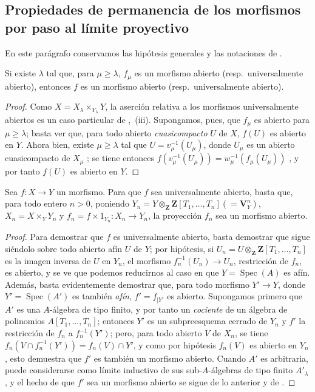 \subsection{Propiedades de permanencia de los morfismos por paso al límite proyectivo}
\label{subsection:IV.8.10}

En este parágrafo conservamos las hipótesis generales y las notaciones de .

\begin{proposition}[8.10.1]
\label{IV.8.10.1}
Si existe $\lambda$ tal que, para $\mu\geqslant\lambda$, $f_\mu$ es un morfismo abierto (resp.\ universalmente abierto), entonces $f$ es un morfismo abierto (resp.\ universalmente abierto).
\end{proposition}

\begin{proof}
Como $X=X_\lambda\times_{Y_\lambda}Y$, la aserción relativa a los morfismos universalmente abiertos es un caso particular de ,~(iii).
Supongamos, pues, que $f_\mu$ es abierto para $\mu\geqslant\lambda$; basta ver que, para todo abierto \emph{cuasicompacto} $U$ de $X$, $f(U)$ es abierto en $Y$.
Ahora bien, existe $\mu\geqslant\lambda$ tal que $U=v_\mu^{-1}(U_\mu)$, donde $U_\mu$ es un abierto cuasicompacto de $X_\mu$ ; se tiene entonces $f(v_\mu^{-1}(U_\mu))=w_\mu^{-1}(f_\mu(U_\mu))$ , y por tanto $f(U)$ es abierto en $Y$.
\end{proof}

\begin{corollary}[8.10.2]
\label{IV.8.10.2}
Sea $f:X\to Y$ un morfismo.
Para que $f$ sea universalmente abierto, basta que, para todo entero $n>0$, poniendo $Y_n=Y\otimes_\mathbf{Z}\mathbf{Z}[T_1,\ldots,T_n](=\mathbf{V}_Y^n)$, $X_n=X\times_Y Y_n$ y $f_n=f\times 1_{Y_n}:X_n\to Y_n$, la proyección $f_n$ sea un morfismo abierto.
\end{corollary}

\begin{proof}
Para demostrar que $f$ es universalmente abierto, basta demostrar que sigue siéndolo sobre todo abierto afín $U$ de $Y$; por hipótesis, si $U_n=U\otimes_\mathbf{Z}\mathbf{Z}[T_1,\ldots,T_n]$ es la imagen inversa de $U$ en $Y_n$, el morfismo $f_n^{-1}(U_n)\to U_n$, restricción de $f_n$, es abierto, y se ve que podemos reducirnos al caso en que $Y=\operatorname{Spec}(A)$ es afín.
Además, basta evidentemente demostrar que, para todo morfismo $Y'\to Y$, donde $Y'=\operatorname{Spec}(A')$ es también \emph{afín}, $f'=f_{|Y'}$ es abierto.
Supongamos primero que $A'$ es una $A$-álgebra de tipo finito, y por tanto un \emph{cociente} de un álgebra de polinomios $A[T_1,\ldots,T_n]$; entonces $Y'$ es un subpreesquema cerrado de $Y_n$ y $f'$ la restricción
de $f_n$ a $f_n^{-1}(Y')$; pero, para todo abierto $V$ de $X_n$, se tiene $f_n(V\cap f_n^{-1}(Y'))=f_n(V)\cap Y'$, y como por hipótesis $f_n(V)$ es abierto en $Y_n$, esto demuestra que $f'$ es también un morfismo abierto.
Cuando $A'$ es arbitraria, puede considerarse como límite inductivo de sus sub-$A$-álgebras de tipo finito $A'_\lambda$, y el hecho de que $f'$ sea un morfismo abierto se sigue de lo anterior y de .
\end{proof}


